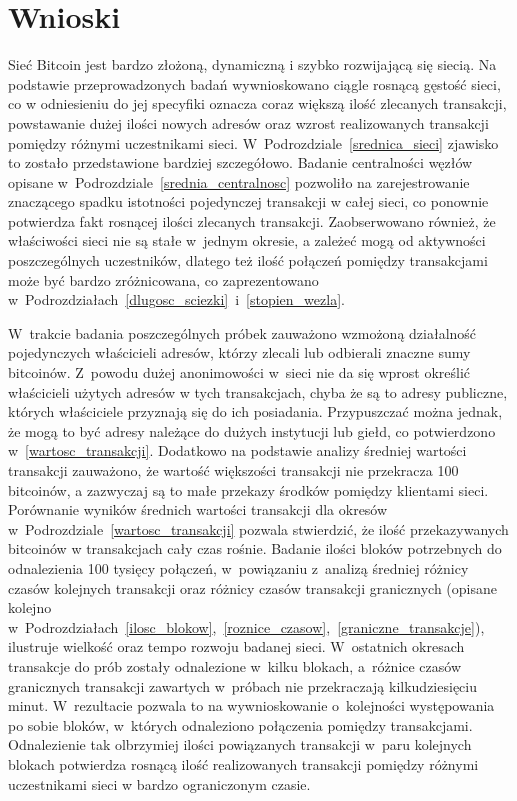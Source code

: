 \documentclass[12pt, oneside, final, openany]{mgr}
\begin{document}
\section{Wnioski}

Sieć Bitcoin jest bardzo złożoną, dynamiczną i szybko rozwijającą się siecią. Na podstawie przeprowadzonych badań wywnioskowano ciągle rosnącą gęstość sieci, co w odniesieniu do jej specyfiki oznacza coraz większą ilość zlecanych transakcji, powstawanie dużej ilości nowych adresów oraz wzrost realizowanych transakcji pomiędzy różnymi uczestnikami sieci. W~Podrozdziale~\ref{srednica_sieci} zjawisko to zostało przedstawione bardziej szczegółowo. Badanie centralności węzłów opisane w~Podrozdziale~\ref{srednia_centralnosc} pozwoliło na zarejestrowanie znaczącego spadku istotności pojedynczej transakcji w całej sieci, co ponownie potwierdza fakt rosnącej ilości zlecanych transakcji. Zaobserwowano również, że właściwości sieci nie są stałe w~jednym okresie, a zależeć mogą od aktywności poszczególnych uczestników, dlatego też ilość połączeń pomiędzy transakcjami może być bardzo zróżnicowana, co zaprezentowano w~Podrozdziałach~\ref{dlugosc_sciezki}~i~\ref{stopien_wezla}. 

\indent W~trakcie badania poszczególnych próbek zauważono wzmożoną działalność pojedynczych właścicieli adresów, którzy zlecali lub odbierali znaczne sumy bitcoinów. Z~powodu dużej anonimowości w~sieci nie da się wprost określić właścicieli użytych adresów w tych transakcjach, chyba że są to adresy publiczne, których właściciele przyznają się do ich posiadania. Przypuszczać można jednak, że mogą to być adresy należące do dużych instytucji lub giełd, co potwierdzono w~\ref{wartosc_transakcji}. Dodatkowo na podstawie analizy średniej wartości transakcji zauważono, że wartość większości transakcji nie przekracza 100 bitcoinów, a zazwyczaj są to małe przekazy środków pomiędzy klientami sieci. Porównanie wyników średnich wartości transakcji dla okresów w~Podrozdziale~\ref{wartosc_transakcji} pozwala stwierdzić, że ilość przekazywanych bitcoinów w transakcjach cały czas rośnie. Badanie ilości bloków potrzebnych do odnalezienia 100 tysięcy połączeń, w~powiązaniu z~analizą średniej różnicy czasów kolejnych transakcji oraz różnicy czasów transakcji granicznych (opisane kolejno w~Podrozdziałach~\ref{ilosc_blokow},~\ref{roznice_czasow},~\ref{graniczne_transakcje}), ilustruje wielkość oraz tempo rozwoju badanej sieci. W~ostatnich okresach transakcje do prób zostały odnalezione w~kilku blokach, a~różnice czasów granicznych transakcji zawartych w~próbach nie przekraczają kilkudziesięciu minut. W~rezultacie pozwala to na wywnioskowanie o~kolejności występowania po sobie bloków, w~których odnaleziono połączenia pomiędzy transakcjami. Odnalezienie tak olbrzymiej ilości powiązanych transakcji w~paru kolejnych blokach potwierdza rosnącą ilość realizowanych transakcji pomiędzy różnymi uczestnikami sieci w bardzo ograniczonym czasie.
\end{document}
